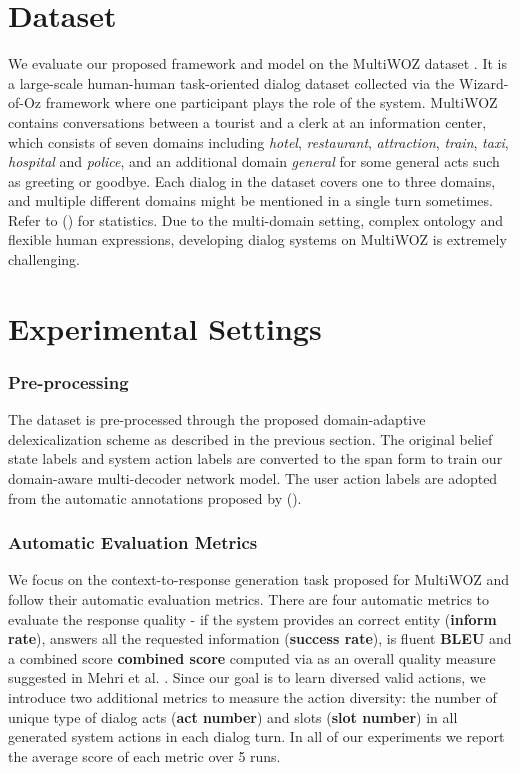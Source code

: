 \documentclass[letterpaper]{article} \usepackage{aaai20}  \usepackage{times}  \usepackage{helvet} \usepackage{courier}  \usepackage[hyphens]{url}  \usepackage{graphicx} \urlstyle{rm} \def\UrlFont{\rm}  \usepackage{graphicx}  \frenchspacing  \setlength{\pdfpagewidth}{8.5in}  \setlength{\pdfpageheight}{11in}  \usepackage{multirow}
\begin{document}
	\section{Dataset}
	We evaluate our proposed framework and model on the MultiWOZ dataset \cite{budzianowski2018multiwoz}. It is a large-scale human-human task-oriented dialog dataset collected via the Wizard-of-Oz framework where one participant plays the role of the system. 
MultiWOZ contains conversations between a tourist and a clerk at an information center, which consists of seven domains including \textit{hotel}, \textit{restaurant}, \textit{attraction}, \textit{train}, \textit{taxi}, \textit{hospital} and \textit{police}, and an additional domain \textit{general} for some general acts such as greeting or goodbye. Each dialog in the dataset covers one to three domains, and multiple different domains might be mentioned in a single turn sometimes. Refer to \citeauthor{budzianowski2018multiwoz} (\citeyear{budzianowski2018multiwoz}) for statistics. Due to the multi-domain setting, complex ontology
and flexible human expressions, developing dialog systems on MultiWOZ is extremely challenging.
	


	
	\section{Experimental Settings}
	
	\subsubsection{Pre-processing}
	
	The dataset is pre-processed through the proposed domain-adaptive delexicalization scheme as described in the previous section. The original belief state labels and system action labels are converted to the span form to train our domain-aware multi-decoder network model. The user action labels are adopted from the automatic annotations proposed by \citeauthor{lee2019convlab} (\citeyear{lee2019convlab}).
	
	
	\subsubsection{Automatic Evaluation Metrics}
	We focus on the context-to-response generation task proposed for MultiWOZ \cite{budzianowski2018multiwoz} and follow their automatic evaluation metrics. There are four automatic metrics to evaluate the response quality - if the system provides an correct entity (\textbf{inform rate}), answers all the requested information (\textbf{success rate}), is fluent \textbf{BLEU} \cite{papineni2002bleu} and a combined score \textbf{combined score} computed via  as an overall quality measure suggested in Mehri et al. . Since our goal is to learn diversed valid actions, we introduce two additional metrics to measure the action diversity: the number of unique type of dialog acts (\textbf{act number}) and slots (\textbf{slot number}) in all generated system actions in each dialog turn. In all of our experiments we report the average score of each metric over 5 runs.
	
\end{document}
